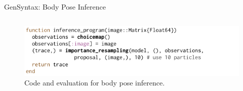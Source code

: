 \documentclass[AERbeamer%
              ,optEnglish%
              ,optBiber%
              ,optBibstyleAlphabetic%
              ,optBeamerClassicFormat%
              ]{AERlatex}%
\begin{document}
\begin{frame}[c]{Gen}{Syntax: Body Pose Inference}
\begin{columns}[T]
\begin{column}{0.48\textwidth}
\begin{figure}
            \end{figure}
            \begin{figure}
                \centering
                \includegraphics[width=\textwidth]{GenBodyPoseInference.png}
                \caption{Code and evaluation for body pose inference.}
            \end{figure}
        \end{column}
    \end{columns}
\end{frame}
\end{document}
